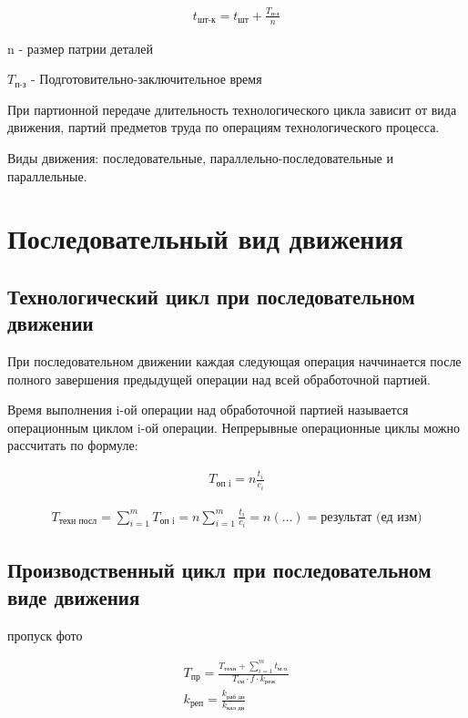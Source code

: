 \documentclass[14pt,a4paper,oneside]{extarticle}
\begin{document}
\begin{gather*}
    t_\text{шт-к}=t_\text{шт}+\frac{T_\text{п-з}}{n}
\end{gather*}

n - размер патрии деталей

$T_\text{п-з}$ - Подготовительно-заключительное время

При партионной передаче длительность технологического цикла зависит от вида движения, партий предметов труда по операциям технологического процесса.

Виды движения: последовательные, параллельно-последовательные и параллельные.

\section{Последовательный вид движения}

\subsection{Технологический цикл при последовательном движении}

При последовательном движении каждая следующая операция наччинается после полного завершения предыдущей операции над всей обработочной партией.

Время выполнения i-ой операции над обработочной партией называется операционным циклом i-ой операции. Непрерывные операционные циклы можно рассчитать по формуле:

\begin{gather*}
    T_\text{оп i}=n\frac{t_i}{c_i}
\end{gather*}

\begin{gather*}
    T_\text{техн посл}=\sum_{i=1}^{m}T_\text{оп i}=n\sum_{i=1}^{m}\frac{t_i}{c_i}=n(\ldots)=\text{результат (ед изм)}
\end{gather*}

\subsection{Производственный цикл при последовательном виде движения}

пропуск фото

\begin{gather*}
    T_\text{пр}=\frac{T_\text{техн}+\sum_{i=1}^{m}t_\text{м.о.}}{T_\text{см}\cdot f\cdot k_\text{реж}}\\
    k_\text{реп}=\frac{k_\text{раб дн}}{k_\text{кал дн}}
\end{gather*}
\end{document}
